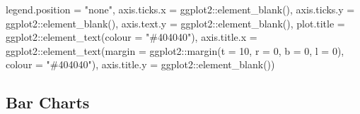 \documentclass[
]{book}
\newenvironment{Shaded}{\begin{snugshade}}{\end{snugshade}}
\newcommand{\AttributeTok}[1]{\textcolor[rgb]{0.77,0.63,0.00}{#1}}
\newcommand{\DecValTok}[1]{\textcolor[rgb]{0.00,0.00,0.81}{#1}}
\newcommand{\FunctionTok}[1]{\textcolor[rgb]{0.00,0.00,0.00}{#1}}
\newcommand{\NormalTok}[1]{#1}
\newcommand{\SpecialCharTok}[1]{\textcolor[rgb]{0.00,0.00,0.00}{#1}}
\newcommand{\StringTok}[1]{\textcolor[rgb]{0.31,0.60,0.02}{#1}}
\begin{document}
\begin{Shaded}
\begin{Highlighting}[]
               \AttributeTok{legend.position =} \StringTok{"none"}\NormalTok{,}
               \AttributeTok{axis.ticks.x =}\NormalTok{ ggplot2}\SpecialCharTok{::}\FunctionTok{element\_blank}\NormalTok{(),}
               \AttributeTok{axis.ticks.y =}\NormalTok{ ggplot2}\SpecialCharTok{::}\FunctionTok{element\_blank}\NormalTok{(),}
               \AttributeTok{axis.text.y =}\NormalTok{ ggplot2}\SpecialCharTok{::}\FunctionTok{element\_blank}\NormalTok{(),}
               \AttributeTok{plot.title =}\NormalTok{ ggplot2}\SpecialCharTok{::}\FunctionTok{element\_text}\NormalTok{(}\AttributeTok{colour =} \StringTok{"\#404040"}\NormalTok{),}
               \AttributeTok{axis.title.x =}\NormalTok{ ggplot2}\SpecialCharTok{::}\FunctionTok{element\_text}\NormalTok{(}\AttributeTok{margin =}\NormalTok{ ggplot2}\SpecialCharTok{::}\FunctionTok{margin}\NormalTok{(}\AttributeTok{t =} \DecValTok{10}\NormalTok{, }\AttributeTok{r =} \DecValTok{0}\NormalTok{, }\AttributeTok{b =} \DecValTok{0}\NormalTok{, }\AttributeTok{l =} \DecValTok{0}\NormalTok{), }\AttributeTok{colour =} \StringTok{"\#404040"}\NormalTok{),}
               \AttributeTok{axis.title.y =}\NormalTok{ ggplot2}\SpecialCharTok{::}\FunctionTok{element\_blank}\NormalTok{())}
\end{Highlighting}
\end{Shaded}

\hypertarget{bar-charts-1}{%
\subsection{Bar Charts}\label{bar-charts-1}}
\end{document}
